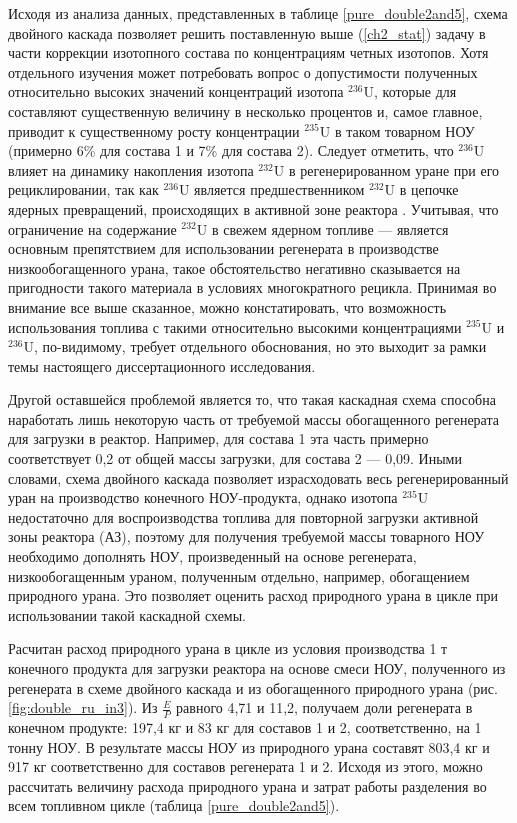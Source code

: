 Исходя из анализа данных, представленных в таблице \ref{pure_double2and5}, схема двойного каскада позволяет решить поставленную выше (\ref{ch2_stat}) задачу в части коррекции изотопного состава по концентрациям четных изотопов. Хотя отдельного изучения может потребовать вопрос о допустимости полученных относительно высоких значений концентраций изотопа $^{236}$U, которые для составляют существенную величину в несколько процентов и, самое главное, приводит к существенному росту концентрации $^{235}$U в таком товарном НОУ (примерно 6\% для состава 1 и 7\% для состава 2). Следует отметить, что $^{236}$U влияет на динамику накопления изотопа $^{232}$U в регенерированном уране при его рециклировании, так как $^{236}$U является предшественником $^{232}$U в цепочке ядерных превращений, происходящих в активной зоне реактора \cite{smirnovEvolutionIsotopicComposition2012}. Учитывая, что ограничение на содержание $^{232}$U в свежем ядерном топливе --- является основным препятствием для использовании регенерата в производстве низкообогащенного урана, такое обстоятельство негативно сказывается на пригодности такого материала в условиях многократного рецикла. Принимая во внимание все выше сказанное, можно констатировать, что возможность использования топлива с такими относительно высокими концентрациями $^{235}$U и $^{236}$U, по-видимому, требует отдельного обоснования, но это выходит за рамки темы настоящего диссертационного исследования.

Другой оставшейся проблемой является то, что такая каскадная схема способна наработать лишь некоторую часть от требуемой массы обогащенного регенерата для загрузки в реактор. Например, для состава 1 эта часть примерно соответствует 0,2 от общей массы загрузки, для состава 2 --- 0,09. Иными словами, схема двойного каскада позволяет израсходовать весь регенерированный уран на производство конечного НОУ-продукта, однако изотопа $^{235}$U недостаточно для воспроизводства топлива для повторной загрузки активной зоны реактора (АЗ), поэтому для получения требуемой массы товарного НОУ необходимо дополнять НОУ, произведенный на основе регенерата, низкообогащенным ураном, полученным отдельно, например, обогащением природного урана. Это позволяет оценить расход природного урана в цикле при использовании такой каскадной схемы. 

Расчитан расход природного урана в цикле из условия производства 1 т конечного продукта для загрузки реактора на основе смеси НОУ, полученного из регенерата в схеме двойного каскада и из обогащенного природного урана (рис. \ref{fig:double_ru_in3}). Из $\frac{E}{P}$ равного 4,71 и 11,2, получаем доли регенерата в конечном продукте: 197,4 кг и 83 кг для составов 1 и 2, соответственно, на 1 тонну НОУ. В результате массы НОУ из природного урана составят 803,4 кг и 917 кг соответственно для составов регенерата 1 и 2. Исходя из этого, можно рассчитать величину расхода природного урана и затрат работы разделения во всем топливном цикле (таблица \ref{pure_double2and5}).

